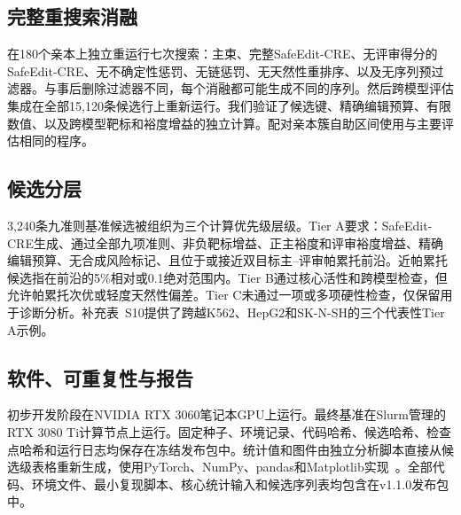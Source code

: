 \subsection{完整重搜索消融}

在180个亲本上独立重运行七次搜索：主束、完整SafeEdit-CRE、无评审得分的SafeEdit-CRE、无不确定性惩罚、无链惩罚、无天然性重排序、以及无序列预过滤器。与事后删除过滤器不同，每个消融都可能生成不同的序列。然后跨模型评估集成在全部15,120条候选行上重新运行。我们验证了候选键、精确编辑预算、有限数值、以及跨模型靶标和裕度增益的独立计算。配对亲本簇自助区间使用与主要评估相同的程序。

\subsection{候选分层}

3,240条九准则基准候选被组织为三个计算优先级层级。Tier A要求：SafeEdit-CRE生成、通过全部九项准则、非负靶标增益、正主裕度和评审裕度增益、精确编辑预算、无合成风险标记、且位于或接近双目标主--评审帕累托前沿。近帕累托候选指在前沿的5\%相对或0.1绝对范围内。Tier B通过核心活性和跨模型检查，但允许帕累托次优或轻度天然性偏差。Tier C未通过一项或多项硬性检查，仅保留用于诊断分析。补充表~S10提供了跨越K562、HepG2和SK-N-SH的三个代表性Tier A示例。

\subsection{软件、可重复性与报告}

初步开发阶段在NVIDIA RTX 3060笔记本GPU上运行。最终基准在Slurm管理的RTX 3080 Ti计算节点上运行。固定种子、环境记录、代码哈希、候选哈希、检查点哈希和运行日志均保存在冻结发布包中。统计值和图件由独立分析脚本直接从候选级表格重新生成，使用PyTorch、NumPy、pandas和Matplotlib实现~\citep{Paszke2019,Harris2020,McKinney2010,Hunter2007}。全部代码、环境文件、最小复现脚本、核心统计输入和候选序列表均包含在v1.1.0发布包中。
